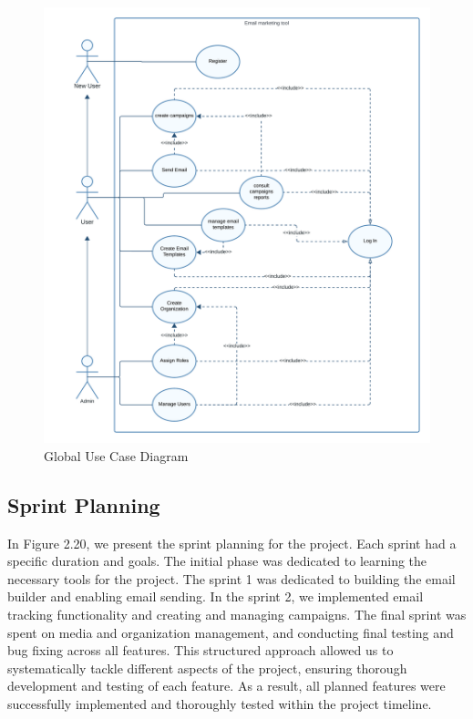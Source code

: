 \begin{figure}[ht]
	\centering
	\includegraphics[width=\linewidth]{Images//images/global use case diag.png}
	\caption{Global Use Case Diagram}
	\label{fig:Global Use Case Diagram}
\end{figure}

\newpage

\subsection{Sprint Planning}

In Figure 2.20, we present the sprint planning for the project. Each sprint had a specific duration and goals.
The initial phase was dedicated to learning the necessary tools for the project.
The sprint 1 was dedicated to building the email builder and enabling email sending.
In the sprint 2, we implemented email tracking functionality and creating and managing campaigns.
The final sprint was spent on media and organization management, and conducting final testing and bug fixing across all features.
This structured approach allowed us to systematically tackle different aspects of the project, ensuring thorough development and testing of each feature.
As a result, all planned features were successfully implemented and thoroughly tested within the project timeline.

